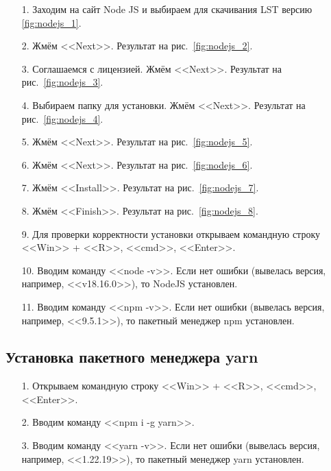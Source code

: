 \begin{enumerate}
    \item[1.] Заходим на сайт Node JS и выбираем для скачивания LST версию \ref{fig:nodejs_1}.
    \item[2.] Жмём <<Next>>. Результат на рис.~\ref{fig:nodejs_2}.
    \item[3.] Соглашаемся с лицензией. Жмём <<Next>>. Результат на рис.~\ref{fig:nodejs_3}.
    \item[4.] Выбираем папку для установки. Жмём <<Next>>. Результат на рис.~\ref{fig:nodejs_4}.
    \item[5.] Жмём <<Next>>. Результат на рис.~\ref{fig:nodejs_5}.
    \item[6.] Жмём <<Next>>. Результат на рис.~\ref{fig:nodejs_6}.
    \item[7.] Жмём <<Install>>. Результат на рис.~\ref{fig:nodejs_7}.
    \item[8.] Жмём <<Finish>>. Результат на рис.~\ref{fig:nodejs_8}.
    \item[9.] Для проверки корректности установки открываем командную строку <<Win>> + <<R>>, <<cmd>>, <<Enter>>.
    \item[10.] Вводим команду <<node -v>>. Если нет ошибки (вывелась версия, например, <<v18.16.0>>),
    то NodeJS установлен.
    \item[11.] Вводим команду <<npm -v>>. Если нет ошибки (вывелась версия, например, <<9.5.1>>),
    то пакетный менеджер npm установлен.
\end{enumerate}

\subsection{Установка пакетного менеджера yarn}

\begin{enumerate}
    \item[1.] Открываем командную строку <<Win>> + <<R>>, <<cmd>>, <<Enter>>.
    \item[2.] Вводим команду <<npm i -g yarn>>.
    \item[3.] Вводим команду <<yarn -v>>. Если нет ошибки (вывелась версия, например, <<1.22.19>>),
    то пакетный менеджер yarn установлен.
\end{enumerate}

